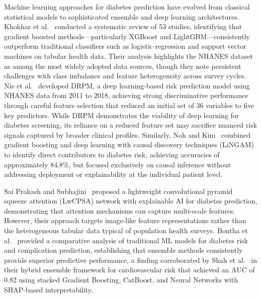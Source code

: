 \documentclass[conference]{IEEEtran}
\begin{document}
Machine learning approaches for diabetes prediction have evolved from classical statistical models to sophisticated ensemble and deep learning architectures. Khokhar et al.~\cite{b1} conducted a systematic review of 53 studies, identifying that gradient boosted methods---particularly XGBoost and LightGBM---consistently outperform traditional classifiers such as logistic regression and support vector machines on tabular health data. Their analysis highlights the NHANES dataset as among the most widely adopted data sources, though they note persistent challenges with class imbalance and feature heterogeneity across survey cycles. Nie et al.~\cite{b3} developed DRPM, a deep learning-based risk prediction model using NHANES data from 2011 to 2018, achieving strong discriminative performance through careful feature selection that reduced an initial set of 36 variables to five key predictors. While DRPM demonstrates the viability of deep learning for diabetes screening, its reliance on a reduced feature set may sacrifice nuanced risk signals captured by broader clinical profiles. Similarly, Noh and Kim~\cite{b6} combined gradient boosting and deep learning with causal discovery techniques (LiNGAM) to identify direct contributors to diabetes risk, achieving accuracies of approximately 84.8\%, but focused exclusively on causal inference without addressing deployment or explainability at the individual patient level.

Sai Prakash and Subhajini~\cite{b8} proposed a lightweight convolutional pyramid squeeze attention (LwCPSA) network with explainable AI for diabetes prediction, demonstrating that attention mechanisms can capture multi-scale features. However, their approach targets image-like feature representations rather than the heterogeneous tabular data typical of population health surveys. Bontha et al.~\cite{b4} provided a comparative analysis of traditional ML models for diabetes risk and complication prediction, establishing that ensemble methods consistently provide superior predictive performance, a finding corroborated by Shah et al.~\cite{b7} in their hybrid ensemble framework for cardiovascular risk that achieved an AUC of 0.82 using stacked Gradient Boosting, CatBoost, and Neural Networks with SHAP-based interpretability.
\end{document}
